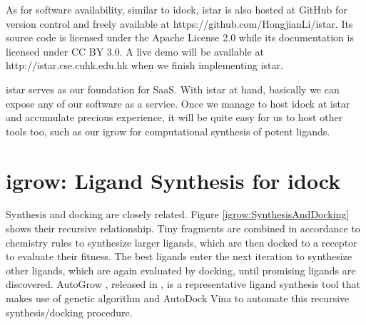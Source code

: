 As for software availability, similar to idock, istar is also hosted at GitHub for version control and freely available at https://github.com/HongjianLi/istar. Its source code is licensed under the Apache License 2.0 while its documentation is licensed under CC BY 3.0. A live demo will be available at http://istar.cse.cuhk.edu.hk when we finish implementing istar.

istar serves as our foundation for SaaS. With istar at hand, basically we can expose any of our software as a service. Once we manage to host idock at istar and accumulate precious experience, it will be quite easy for us to host other tools too, such as our igrow for computational synthesis of potent ligands.

\section{igrow: Ligand Synthesis for idock}

Synthesis and docking are closely related. Figure \ref{igrow:SynthesisAndDocking} shows their recursive relationship. Tiny fragments are combined in accordance to chemistry rules to synthesize larger ligands, which are then docked to a receptor to evaluate their fitness. The best ligands enter the next iteration to synthesize other ligands, which are again evaluated by docking, until promising ligands are discovered. AutoGrow \citep{466}, released in \citeyear{466}, is a representative ligand synthesis tool that makes use of genetic algorithm and AutoDock Vina \citep{595} to automate this recursive synthesis/docking procedure.

